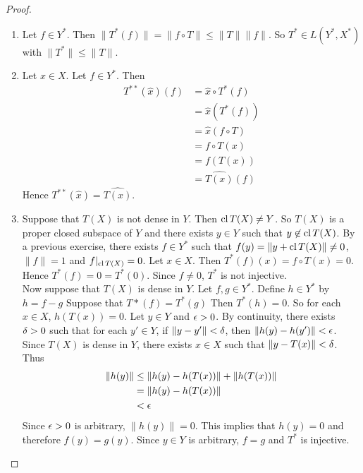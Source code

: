 \documentclass{book}
\begin{document}
	\begin{proof}\
		\begin{enumerate}
			\item Let $f \in Y^*$. Then $\|T^* (f) \|= \|f \circ T \|\leq  \|T \| \|f \|$. So $T^* \in L(Y^*, X^*)$ with $\|T^* \|\leq \|T \|$.\vspace{.5cm}\\
			\item Let $x \in X$. Let $f \in Y^*$. Then 
			\begin{align*}
				T^{**}(\hat{x})(f) 
				&= \hat{x} \circ T^{*}(f) \\
				&= \hat{x}(T^* (f)) \\
				&= \hat{x}(f \circ T) \\
				&= f \circ T (x) \\
				&= f(T(x)) \\
				&= \widehat{T(x)}(f)
			\end{align*} 
			Hence $T^{**}(\hat{x}) = \widehat{T(x)}$.\vspace{.5cm}\\
			\item Suppose that $T(X)$ is not dense in $Y$. Then $\operatorname{cl} T(X) \neq Y$. So $T(X)$ is a proper closed subspace of $Y$ and there exists $y \in Y$ such that $y \not \in \operatorname{cl} T(X)$. By a previous exercise, there exists $f \in Y^*$ such that $f(y) = \|y+\operatorname{cl} T(X) \|\neq 0$, $\|f \|=1$ and $f|_{\operatorname{cl} T(X)} = 0$. Let $x \in X$. Then $T^*(f)(x) = f \circ T(x) = 0$. Hence $T^*(f) = 0 = T^*(0)$. Since $f \neq 0$, $T^*$ is not injective.\\ Now suppose that $T(X)$ is dense in $Y$. Let $f,g \in Y^*$. Define $h \in Y^*$ by $h = f-g$ Suppose that $T*(f) = T^*(g)$ Then $T^*(h) = 0$. So for each $x \in X$, $h(T(x)) = 0$. Let $y \in Y$ and $\epsilon >0$. By continuity, there exists $\delta > 0 $ such that for each $y' \in Y$, if $\|y - y' \|< \delta$, then $\|h(y) - h(y') \|< \epsilon$. Since $T(X)$ is dense in $Y$, there exists $x \in X$ such that $\|y - T(x) \|< \delta$. Thus 
			\begin{align*}
				\|h (y) \|
				&\leq \|h(y) - h(T(x)) \|+ \|h(T(x)) \|\\
				& = \|h(y) - h(T(x)) \| \\
				& < \epsilon
			\end{align*} 
			Since $\epsilon > 0$ is arbitrary, $\|h(y) \|= 0$. This implies that $h(y) = 0$ and therefore $f(y) = g(y) $. Since $y \in Y$ is arbitrary, $f=g$ and $T^*$ is injective. \vspace{.5cm}\\

\end{enumerate}
\end{proof}
\end{document}
